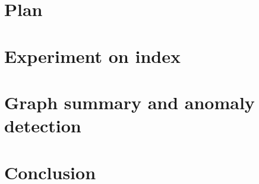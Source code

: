 \documentclass[12pt]{article}
\begin{document}
\section{Plan}
    \label{sec:plan}
    
    
\section{Experiment on index}
    \label{sec:indexexp}
    

%     

%   

\section{Graph summary and anomaly detection}
   \label{sec:graphsummary}
   

\section{Conclusion}
   \label{sec:conclusion}
   




\newpage
{}
\tableofcontents
\end{document}
